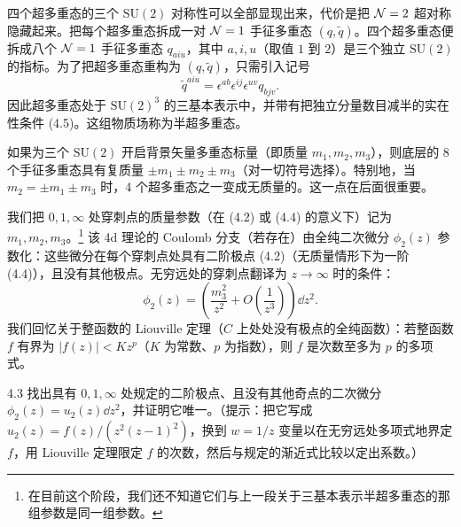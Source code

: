  四个超多重态的三个 $\mathrm{SU}(2)$ 对称性可以全部显现出来，代价是把 $\mathcal{N}=2$ 超对称隐藏起来。把每个超多重态拆成一对 $\mathcal{N}=1$ 手征多重态 $(q,\tilde q)$。四个超多重态便拆成八个 $\mathcal{N}=1$ 手征多重态 $q_{aiu}$，其中 $a,i,u$（取值 $1$ 到 $2$）是三个独立 $\mathrm{SU}(2)$ 的指标。为了把超多重态重构为 $(q,\tilde q)$，只需引入记号
\begin{equation}
  \tilde q^{aiu}=\epsilon^{ab}\epsilon^{ij}\epsilon^{uv}q_{bjv}.
  \tag{4.5}
\end{equation}
因此超多重态处于 $\mathrm{SU}(2)^3$ 的三基本表示中，并带有把独立分量数目减半的实在性条件 (4.5)。这组物质场称为半超多重态。

如果为三个 $\mathrm{SU}(2)$ 开启背景矢量多重态标量（即质量 $m_1,m_2,m_3$），则底层的 8 个手征多重态具有复质量 $\pm m_1\pm m_2\pm m_3$（对一切符号选择）。特别地，当 $m_2=\pm m_1\pm m_3$ 时，4 个超多重态之一变成无质量的。这一点在后面很重要。


 我们把 $0,1,\infty$ 处穿刺点的质量参数（在 (4.2) 或 (4.4) 的意义下）记为 $m_1,m_2,m_3$。\footnote{在目前这个阶段，我们还不知道它们与上一段关于三基本表示半超多重态的那组参数是同一组参数。} 该 4d 理论的 Coulomb 分支（若存在）由全纯二次微分 $\phi_2(z)$ 参数化：这些微分在每个穿刺点处具有二阶极点 (4.2)（无质量情形下为一阶 (4.4)），且没有其他极点。无穷远处的穿刺点翻译为 $z\to\infty$ 时的条件：
\begin{equation}
  \phi_2(z)=\left(\frac{m_3^2}{z^2}+O\!\left(\frac{1}{z^3}\right)\right)\dd z^2.
  \tag{4.6}
\end{equation}
我们回忆关于整函数的 Liouville 定理（$C$ 上处处没有极点的全纯函数）：若整函数 $f$ 有界为 $|f(z)|<Kz^p$（$K$ 为常数、$p$ 为指数），则 $f$ 是次数至多为 $p$ 的多项式。

\begin{exercise}{4.3}
找出具有 $0,1,\infty$ 处规定的二阶极点、且没有其他奇点的二次微分 $\phi_2(z)=u_2(z)\dd z^2$，并证明它唯一。（提示：把它写成 $u_2(z)=f(z)/(z^2(z-1)^2)$，换到 $w=1/z$ 变量以在无穷远处多项式地界定 $f$，用 Liouville 定理限定 $f$ 的次数，然后与规定的渐近式比较以定出系数。）
\end{exercise}

